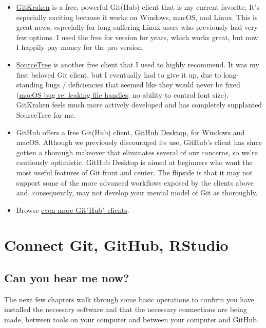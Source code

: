 \documentclass[
]{book}
\begin{document}
\begin{itemize}
\item
  \href{https://www.gitkraken.com}{GitKraken} is a free, powerful Git(Hub) client that is my current favorite. It's especially exciting because it works on Windows, macOS, and Linux. This is great news, especially for long-suffering Linux users who previously had very few options. I used the free for version for years, which works great, but now I happily pay money for the pro version.
\item
  \href{https://www.sourcetreeapp.com}{SourceTree} is another free client that I used to highly recommend. It was my first beloved Git client, but I eventually had to give it up, due to long-standing bugs / deficiencies that seemed like they would never be fixed (\href{http://openradar.appspot.com/radar?id=1387401}{macOS bug re: leaking file handles}, no ability to control font size). GitKraken feels much more actively developed and has completely supplanted SourceTree for me.
\item
  GitHub offers a free Git(Hub) client, \href{https://desktop.github.com/}{GitHub Desktop}, for Windows and macOS. Although we previously discouraged its use, GitHub's client has since gotten a thorough makeover that eliminates several of our concerns, so we're cautiously optimistic. GitHub Desktop is aimed at beginners who want the most useful features of Git front and center. The flipside is that it may not support some of the more advanced workflows exposed by the clients above and, consequently, may not develop your mental model of Git as thoroughly.
\item
  Browse \href{http://git-scm.com/downloads/guis}{even more Git(Hub) clients}.
\end{itemize}

\part{Connect Git, GitHub, RStudio}\label{part-connect-git-github-rstudio}

\chapter*{Can you hear me now?}\label{connect-intro}

The next few chapters walk through some basic operations to confirm you have installed the necessary software and that the necessary connections are being made, between tools on your computer and between your computer and GitHub.
\end{document}
